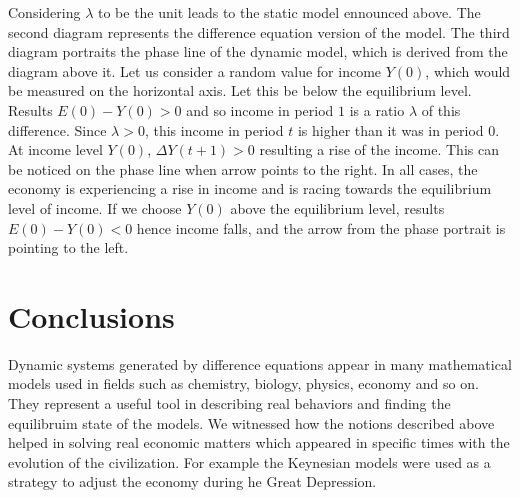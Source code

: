 \documentclass[a4paper,11pt]{report}
\begin{document}
Considering $\lambda$ to be the unit leads to the static model ennounced above. The second diagram represents the difference equation version of the model. The third diagram portraits the phase line of the dynamic model, which is derived from the diagram above it.
Let us consider a random value for income $Y(0)$, which would be measured on the horizontal axis. Let this be below the equilibrium level. Results $E(0)-Y(0)>0$ and so income in period $1$ is a ratio $\lambda$ of this difference. Since $\lambda>0$, this income in period $t$ is higher than it was in period $0$. At income level $Y(0)$, $\Delta Y(t+1)>0$ resulting a rise of the income. This can be noticed on the phase line when arrow points to the right. In all cases, the economy is experiencing a rise in income and is racing towards the equilibrium level of income. If we choose $Y(0)$ above the equilibrium level, results $E(0)-Y(0)<0$ hence income falls, and the arrow from the phase portrait is pointing to the left.



\section{Conclusions}
Dynamic systems generated by difference equations appear in many mathematical models used in fields such as chemistry, biology, physics, economy and so on. They represent a useful tool in describing real behaviors and finding the equilibruim state of the models.  We witnessed how the notions described above helped in solving real economic matters which appeared in specific times with the evolution of the civilization. For example the Keynesian models were used as a strategy to adjust the economy during he Great Depression.
\end{document}
